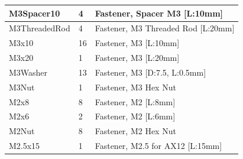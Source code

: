 \begin{table}[h!]
{\begin{tabular}{ | l | l | l |}
    	M3Spacer10 & 4 & Fastener, Spacer M3  [L:10mm] \\ \hline
	M3ThreadedRod & 4 & Fastener, M3 Threaded Rod [L:20mm] \\ \hline	
    	M3x10 & 16 & Fastener, M3 [L:10mm] \\ \hline
    	M3x20 & 1 & Fastener, M3 [L:20mm] \\ \hline
    	M3Washer &  13 & Fastener, M3 [D:7.5, L:0.5mm] \\ \hline
    	M3Nut &  1 & Fastener, M3 Hex Nut \\ \hline
    	M2x8 & 8 & Fastener, M2 [L:8mm] \\ \hline
    	M2x6 & 2 & Fastener, M2 [L:6mm] \\ \hline
    	M2Nut & 8 & Fastener, M2 Hex Nut \\ \hline
	M2.5x15 & 1 & Fastener, M2.5 for AX12 [L:15mm] \\ \hline
    	\end{tabular}
}
\end{table}

\vspace{0.2cm}

